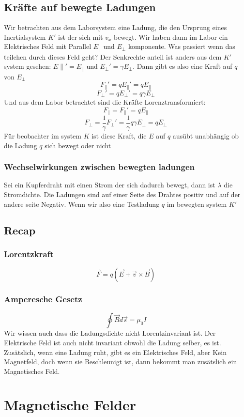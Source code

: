 \documentclass{article}
\begin{document}
\subsection*{Kräfte auf bewegte Ladungen} Wir betrachten aus dem Laborsystem eine Ladung, die den Ursprung eines Inertialsystem $K'$ ist der sich mit $v_x$ bewegt. Wir haben dann im Labor ein Elektrisches Feld mit Parallel $E_\parallel$ und $E_\perp$ komponente. Was passiert wenn das teilchen durch dieses Feld geht?
Der Senkrechte anteil ist anders aus dem $K'$ system gesehen: $E\parallel'=E_\parallel$ und $E_\perp'=\gamma E_\perp$. Dann gibt es also eine Kraft auf 
$q$ von $E_\perp$\[F_\parallel'=qE_\parallel'=qE_\parallel\]\[F_\perp'=qE_\perp'=q\gamma E_\perp\]
Und aus dem Labor betrachtet sind die Kräfte Lorenztransformiert:
\[F_\parallel=F_\parallel'=qE_\parallel\]\[F_\perp=\frac{1}{\gamma}F_\perp'=\frac{1}{\gamma}q\gamma E_\perp=qE_\perp\]
Für beobachter im system $K$ ist diese Kraft, die $E$ auf $q$ ausübt unabhängig ob die Ladung $q$ sich bewegt oder nicht
\subsubsection*{Wechselwirkungen zwischen bewegten ladungen}
Sei ein Kupferdraht mit einen Strom der sich dadurch bewegt, dann ist $\lambda$ die Stromdichte. Die Ladungen sind auf einer Seite des Drahtes positiv und auf der andere seite Negativ. Wenn wir also eine Testladung $q$ im bewegten system $K'$
\subsection*{Recap}
\subsubsection*{Lorentzkraft} \[\vec{F}=q(\vec{E}+\vec{v}\times\vec{B})\]
\subsubsection*{Amperesche Gesetz}\[\oint\vec{B}d\vec{s}=\mu_0 I\]
Wir wissen auch dass die Ladungsdichte nicht Lorentzinvariant ist. Der Elektrische Feld ist auch nicht invariant obwohl die Ladung selber, es ist.\newline
Zusätslich, wenn eine Ladung ruht, gibt es ein Elektrisches Feld, aber Kein Magnetfeld, doch wenn sie Beschleunigt ist, dann bekommt man zusätslich ein Magnetisches Feld.
\section{Magnetische Felder}
\end{document}
